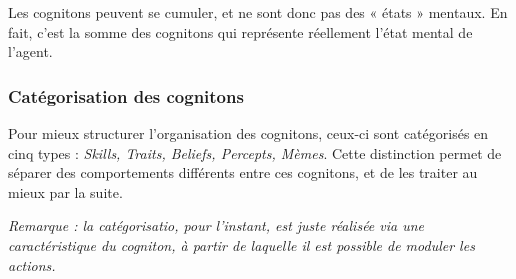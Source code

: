 \documentclass[a4paper,oneside,12 pt]{article}
\begin{document}
	Les cognitons peuvent se cumuler, et ne sont donc pas des « états » mentaux. En fait, c'est la somme des cognitons qui représente réellement l'état mental de l'agent.
	
\subsubsection{Catégorisation des cognitons}

	Pour mieux structurer l'organisation des cognitons, ceux-ci sont catégorisés en cinq types :\textit{ Skills, Traits, Beliefs, Percepts, Mèmes}. Cette distinction permet de séparer des comportements différents entre ces cognitons, et de les traiter au mieux par la suite.
	
	
	\textit{Remarque : la catégorisatio, pour l'instant, est juste réalisée via une caractéristique du cogniton, à partir de laquelle il est possible de moduler les actions.}
\end{document}
